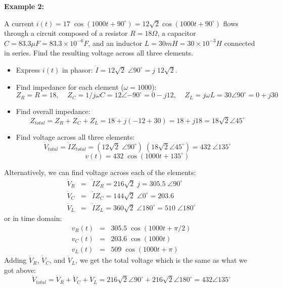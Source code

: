 \documentclass{article}
\begin{document}

{\bf Example 2:} 

A current $i(t)=17\;\cos(1000t+90^\circ)=12\sqrt{2}\cos(1000t+90^\circ)$ 
flows through a circuit composed of a resistor $R=18\Omega$, a capacitor
$C=83.3\mu F=83.3\times 10^{-6}F$, and an inductor $L=30 mH=30\times 
10^{-3}H$ connected in series. Find the resulting voltage across all 
three elements.

\begin{itemize}
\item Express $i(t)$ in phasor: $\dot{I}=12\sqrt{2}\;\angle{90^\circ}
  =j\;12\sqrt{2}$.
\item Find impedance for each element ($\omega=1000$):
  \begin{equation}
    Z_R=R=18,\;\;\;\;Z_C=1/j\omega C=12\angle{-90^\circ}=0-j12,\;\;\;\;
    Z_L=j\omega L=30\angle{90^\circ}=0+j30	
  \end{equation}
\item Find overall impedance:
  \begin{equation} 
    Z_{total}=Z_R+Z_C+Z_L=18+j(-12+30)=18+j18=18\sqrt{2}\angle{45^\circ} 
  \end{equation}
\item Find voltage across all three elements:
  \begin{equation}
    \dot{V}_{total}=\dot{I}Z_{total}=(12\sqrt{2}\;\angle{90^\circ})\;(18\sqrt{2}\angle{45^\circ})
    =432\;\angle{135^\circ}	
  \end{equation}
  \begin{equation}
    v(t)=432\;\cos(1000t+135^\circ)
  \end{equation}
\end{itemize}
Alternatively, we can find voltage across each of the elements:
\begin{eqnarray}
  \dot{V}_R&=&\dot{I}Z_R=216\sqrt{2}\;j=305.5\;\angle{90^\circ}
  \nonumber\\
  \dot{V}_C&=&\dot{I}Z_C=144\sqrt{2}\;\angle{0^\circ}=203.6
  \nonumber\\
  \dot{V}_L&=&\dot{I}Z_L=360\sqrt{2}\;\angle{180^\circ}=510\;\angle{180^\circ}
\end{eqnarray}
or in time domain:
\begin{eqnarray}
  v_R(t)&=&305.5\; \cos(1000t+\pi/2)
  \nonumber\\
  v_C(t)&=&203.6\; \cos(1000t)
  \nonumber\\
  v_L(t)&=&509\; \cos(1000t+\pi) 
\end{eqnarray}
Adding $\dot{V}_R$, $\dot{V}_C$, and $\dot{V}_L$, we get the total voltage
which is the same as what we got above:
\begin{equation} 
  \dot{V}_{total}=\dot{V}_R+\dot{V}_C+\dot{V}_L
  =216\sqrt{2}\angle{90^\circ}+216\sqrt{2}\angle{180^\circ}=432 \angle{135^\circ}	
\end{equation}
\end{document}
